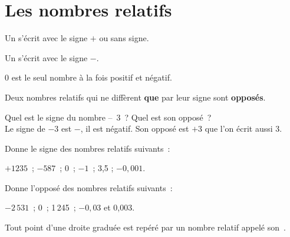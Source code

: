 \section{Les nombres relatifs}


\vspace{4em}

\begin{definition}
Un  s'écrit avec le signe $+$ ou sans signe.

Un  s'écrit avec le signe $-$. 

0 est le seul nombre à la fois positif et négatif.

Deux nombres relatifs qui ne diffèrent \textbf{que} par leur signe sont \textbf{opposés}.
\end{definition}

\vspace{4em}


\begin{methode*1}



\begin{exemple*1}
Quel est le signe du nombre – 3 ? Quel est son opposé ? \\[1em]
Le signe de $- 3$ est $-$, il est négatif. Son opposé est $+ 3$ que l'on écrit aussi 3.
\end{exemple*1}

\exercice 
Donne le signe des nombres relatifs suivants :

$+ 1235$ ; $- 587$ ; 0 ; $- 1$ ;  3,5 ; $- 0,001$.

\exercice 
Donne l'opposé des nombres relatifs suivants :

$- 2\,531$ ; 0 ; 1\,245 ;  $- 0,03$ et 0,003.

\end{methode*1}


\newpage


\begin{aconnaitre}
Tout point d'une droite graduée est repéré par un nombre relatif appelé son .


\end{aconnaitre}

